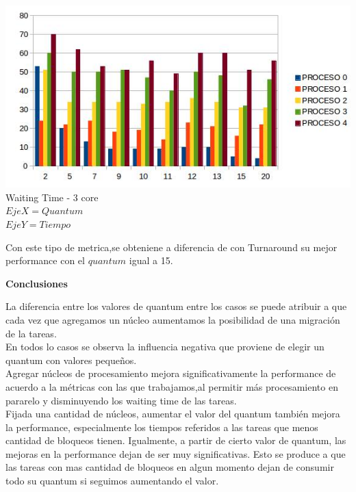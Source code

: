   \begin{center}
    	\includegraphics[width=1\textwidth]{./EJ7/waintin3core.jpg}
	{Waiting Time - 3 core}	\\
	{$Eje X = Quantum $\\$Eje Y = Tiempo$}\\
 \end{center} 
 
   \indent Con este tipo de metrica,se obteniene a diferencia de con Turnaround  su mejor
   performance con el $quantum$ igual a 15.\\
  
 \begin{center}
  \textbf{Conclusiones}
 \end{center}


\indent \indent La diferencia entre los valores de quantum entre los casos se puede atribuir a que cada vez que 
agregamos un núcleo aumentamos la posibilidad de una migración de la tareas.\\
\indent \indent En todos lo casos se observa la influencia negativa que proviene de elegir un quantum con valores pequeños.\\
\indent \indent Agregar núcleos de procesamiento mejora significativamente la performance de acuerdo a la métricas con las que
trabajamos,al permitir más procesamiento en pararelo y disminuyendo los waiting time de las tareas.\\
\indent \indent  Fijada una cantidad de núcleos, aumentar el valor del quantum también mejora la performance, 
especialmente los tiempos referidos a las tareas que menos cantidad de bloqueos tienen. 
Igualmente, a partir de cierto valor de quantum, las mejoras en la performance dejan de ser muy significativas. 
Esto se produce a que las tareas con mas cantidad de bloqueos en algun momento dejan de consumir todo
su quantum si seguimos aumentando el valor. 
 
